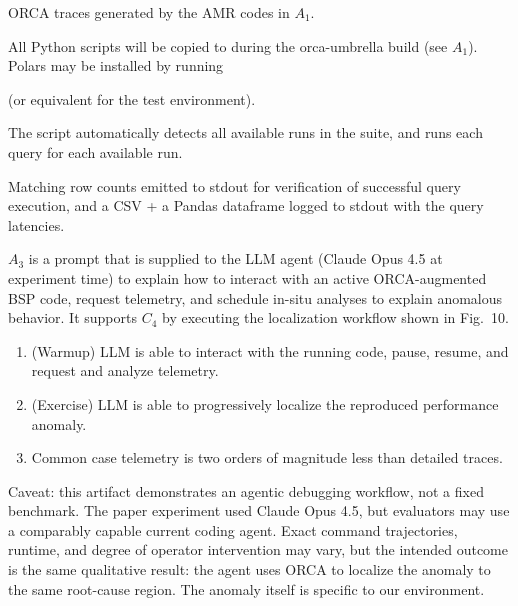 \documentclass[nonacm,sigconf]{acmart}
\begin{document}
ORCA traces generated by the AMR codes in $A_1$.

All Python scripts will be copied to  during the orca-umbrella build (see $A_1$). 
Polars may be installed by running
\begin{center}
\end{center}
(or equivalent for the test environment).

\artcomp

The script automatically detects all available runs in the suite, and runs each query for each available run.

\artout

Matching row counts emitted to stdout for verification of successful query execution, and a CSV + a Pandas dataframe logged to stdout with the query latencies.

\newartifact

\artrel

$A_3$ is a prompt that is supplied to the LLM agent (Claude Opus 4.5 at experiment time)
to explain how to interact with an active ORCA-augmented BSP code, request telemetry, and schedule
in-situ analyses to explain anomalous behavior.
It supports $C_4$ by executing the localization workflow shown in Fig.~10.

\artexp

\begin{enumerate}
	\item (Warmup) LLM is able to interact with the running code, pause, resume, and request and analyze telemetry.
	\item (Exercise) LLM is able to progressively localize the reproduced performance anomaly.
	\item Common case telemetry is two orders of magnitude less than detailed traces.
\end{enumerate}

Caveat: this artifact demonstrates an agentic debugging workflow, not a fixed benchmark. The paper experiment used Claude Opus 4.5, but evaluators may use a comparably capable current coding agent. Exact command trajectories, runtime, and degree of operator intervention may vary, but the intended outcome is the same qualitative result: the agent uses ORCA to localize the anomaly to the same root-cause region. The anomaly itself is specific to our environment.
\end{document}
